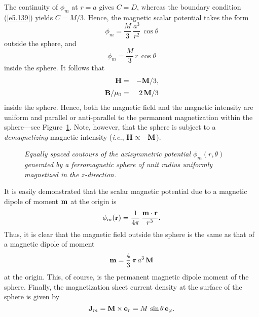 The continuity of $\phi_m$ at $r=a$ gives
$C = D$,
whereas the boundary condition (\ref{e5.139}) yields $C=M/3$. 
Hence, the magnetic scalar potential takes the form
\begin{equation}
\phi_m = \frac{M}{3} \,\frac{a^3}{r^2}\,\cos\theta
\end{equation}
outside the sphere, and
\begin{equation}
\phi_m = \frac{M}{3}\,r\,\cos\theta
\end{equation}
inside the sphere. It follows that
\begin{eqnarray}
{\bf H} &=& - {\bf M}/3,\\[0.5ex]
{\bf B}/\mu_0 &=& 2\,{\bf M}/3
\end{eqnarray}
inside the sphere. Hence, both the magnetic field and the magnetic intensity
are uniform and parallel or anti-parallel to the permanent magnetization within the sphere---see Figure~\ref{fex8}. Note, however, that the sphere is subject to a {\em demagnetizing}\/ magnetic intensity ({\em i.e.}, ${\bf H}\propto - {\bf M}$).
\begin{figure}
\centerline{}
\caption{\em Equally spaced coutours of the axisymmetric potential
$\phi_m(r,\theta)$ generated by a ferromagnetic sphere of unit radius uniformly magnetized in the $z$-direction.}\label{fex8}
\end{figure}


It is easily demonstrated that the scalar magnetic potential due to a magnetic
dipole of moment ${\bf m}$ at the origin is
\begin{equation}
\phi_m({\bf r}) = \frac{1}{4\pi}\,\frac{{\bf m}\cdot{\bf r}}{r^3}.
\end{equation}
Thus, it is clear that the magnetic field outside the sphere is the same as
that of a magnetic dipole of moment
\begin{equation}
{\bf m} = \frac{4}{3}\,\pi\,a^3\,{\bf M}
\end{equation}
at the origin. This, of course, is the permanent magnetic dipole moment of the sphere.
Finally, the magnetization sheet current density at the surface of the sphere is given by
\begin{equation}
{\bf J}_m = {\bf M} \times {\bf e}_r = M\,\sin\theta\,{\bf e}_\varphi.
\end{equation}

